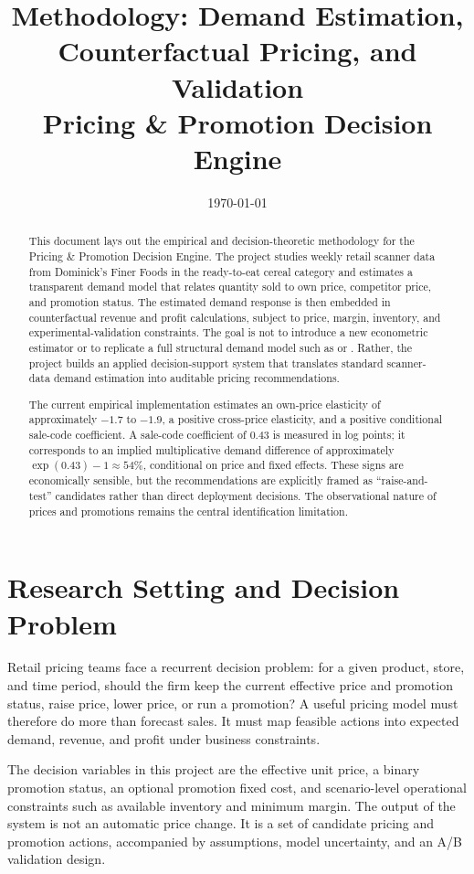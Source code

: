 \documentclass[11pt]{article}
\title{\textbf{Methodology: Demand Estimation, Counterfactual Pricing, and Validation}\\
\large Pricing \& Promotion Decision Engine}
\author{}
\date{\today}
\begin{document}
\maketitle

\begin{abstract}
This document lays out the empirical and decision-theoretic methodology for the Pricing \& Promotion Decision Engine. The project studies weekly retail scanner data from Dominick's Finer Foods in the ready-to-eat cereal category and estimates a transparent demand model that relates quantity sold to own price, competitor price, and promotion status. The estimated demand response is then embedded in counterfactual revenue and profit calculations, subject to price, margin, inventory, and experimental-validation constraints. The goal is not to introduce a new econometric estimator or to replicate a full structural demand model such as \citet{berry1995} or \citet{nevo2001}. Rather, the project builds an applied decision-support system that translates standard scanner-data demand estimation into auditable pricing recommendations.

The current empirical implementation estimates an own-price elasticity of approximately $-1.7$ to $-1.9$, a positive cross-price elasticity, and a positive conditional sale-code coefficient. A sale-code coefficient of 0.43 is measured in log points; it corresponds to an implied multiplicative demand difference of approximately $\exp(0.43)-1\approx 54\%$, conditional on price and fixed effects. These signs are economically sensible, but the recommendations are explicitly framed as ``raise-and-test'' candidates rather than direct deployment decisions. The observational nature of prices and promotions remains the central identification limitation.
\end{abstract}

\section{Research Setting and Decision Problem}

Retail pricing teams face a recurrent decision problem: for a given product, store, and time period, should the firm keep the current effective price and promotion status, raise price, lower price, or run a promotion? A useful pricing model must therefore do more than forecast sales. It must map feasible actions into expected demand, revenue, and profit under business constraints.

The decision variables in this project are the effective unit price, a binary promotion status, an optional promotion fixed cost, and scenario-level operational constraints such as available inventory and minimum margin. The output of the system is not an automatic price change. It is a set of candidate pricing and promotion actions, accompanied by assumptions, model uncertainty, and an A/B validation design.
\end{document}
